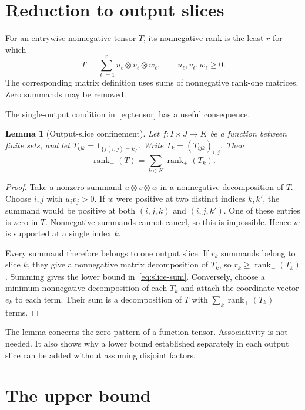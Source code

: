 \documentclass[11pt,a4paper]{article}
\newtheorem{lemma}[theorem]{Lemma}
\theoremstyle{definition}
\DeclareMathOperator{\rank}{rank}
\newcommand{\ind}{\mathbf 1}
\begin{document}
\section{Reduction to output slices}

For an entrywise nonnegative tensor $T$, its nonnegative rank is the least
$r$ for which
\begin{equation}\label{eq:rank}
 T=\sum_{\ell=1}^{r}u_\ell\otimes v_\ell\otimes w_\ell,
 \qquad u_\ell,v_\ell,w_\ell\geq0.
\end{equation}
The corresponding matrix definition uses sums of nonnegative rank-one
matrices. Zero summands may be removed.

The single-output condition in~\eqref{eq:tensor} has a useful consequence.

\begin{lemma}[Output-slice confinement]\label{lem:slices}
Let $f:I\times J\to K$ be a function between finite sets, and let
$T_{ijk}=\ind_{\{f(i,j)=k\}}$. Write $T_k=(T_{ijk})_{i,j}$. Then
\begin{equation}\label{eq:slice-sum}
 \rank_+(T)=\sum_{k\in K}\rank_+(T_k).
\end{equation}
\end{lemma}

\begin{proof}
Take a nonzero summand $u\otimes v\otimes w$ in a nonnegative decomposition
of $T$. Choose $i,j$ with $u_i v_j>0$. If $w$ were positive at two distinct
indices $k,k'$, the summand would be positive at both $(i,j,k)$ and
$(i,j,k')$. One of these entries is zero in $T$. Nonnegative summands
cannot cancel, so this is impossible. Hence $w$ is supported at a single
index $k$.

Every summand therefore belongs to one output slice. If $r_k$ summands
belong to slice $k$, they give a nonnegative matrix decomposition of $T_k$,
so $r_k\geq\rank_+(T_k)$. Summing gives the lower bound
in~\eqref{eq:slice-sum}. Conversely, choose a minimum nonnegative
decomposition of each $T_k$ and attach the coordinate vector $e_k$ to
each term. Their sum is a decomposition of $T$ with
$\sum_k\rank_+(T_k)$ terms.
\end{proof}

The lemma concerns the zero pattern of a function tensor. Associativity
is not needed. It also shows why a lower bound established separately
in each output slice can be added without assuming disjoint factors.

\section{The upper bound}
\end{document}
